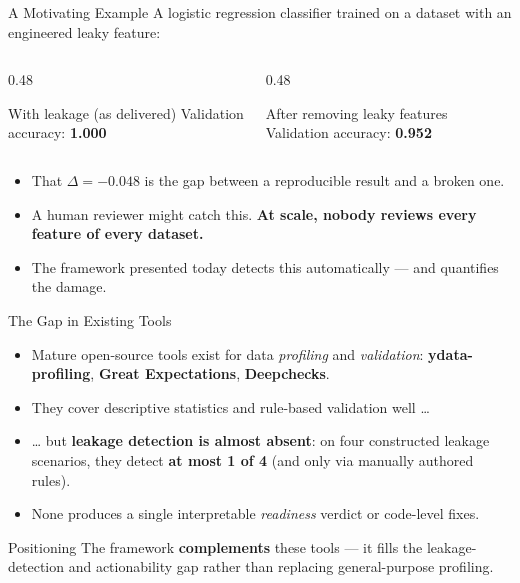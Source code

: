 \documentclass[11pt,aspectratio=169]{beamer}
\begin{document}
\begin{frame}{A Motivating Example}
  A logistic regression classifier trained on a dataset with an engineered leaky feature:
  \vspace{0.8em}
  \begin{columns}[T]
    \begin{column}{0.48\textwidth}
      \begin{alertblock}{With leakage (as delivered)}
        \centering\Large Validation accuracy: \textbf{1.000}
      \end{alertblock}
    \end{column}
    \begin{column}{0.48\textwidth}
      \begin{exampleblock}{After removing leaky features}
        \centering\Large Validation accuracy: \textbf{0.952}
      \end{exampleblock}
    \end{column}
  \end{columns}
  \vspace{1.0em}
  \begin{itemize}\setlength\itemsep{0.5em}
    \item That $\Delta = -0.048$ is the gap between a reproducible result and a broken one.
    \item A human reviewer might catch this. \textbf{At scale, nobody reviews every feature of every dataset.}
    \item The framework presented today detects this automatically --- and quantifies the damage.
  \end{itemize}
\end{frame}

\begin{frame}{The Gap in Existing Tools}
  \begin{itemize}\setlength\itemsep{0.5em}
    \item Mature open-source tools exist for data \emph{profiling} and \emph{validation}:
      \textbf{ydata-profiling}, \textbf{Great Expectations}, \textbf{Deepchecks}.
    \item They cover descriptive statistics and rule-based validation well \ldots
    \item \ldots{} but \textbf{leakage detection is almost absent}: on four constructed leakage scenarios, they detect \textbf{at most 1 of 4} (and only via manually authored rules).
    \item None produces a single interpretable \emph{readiness} verdict or code-level fixes.
  \end{itemize}
  \vspace{0.6em}
  \begin{block}{Positioning}
    The framework \textbf{complements} these tools --- it fills the leakage-detection and
    actionability gap rather than replacing general-purpose profiling.
  \end{block}
\end{frame}
\end{document}
